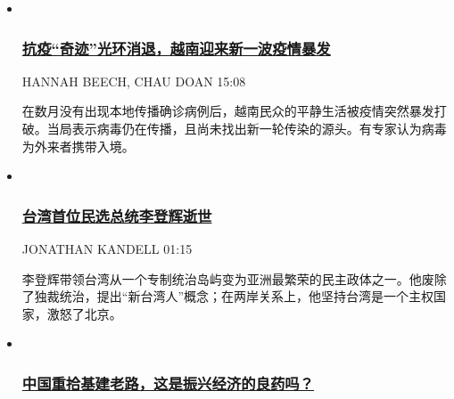 \begin{itemize}
\item ~
  \hypertarget{ux6297ux75abux5947ux8ff9ux5149ux73afux6d88ux9000ux8d8aux5357ux8fceux6765ux65b0ux4e00ux6ce2ux75abux60c5ux66b4ux53d1}{%
  \subsubsection{\texorpdfstring{\href{/asia-pacific/20200731/coronavirus-vietnam/}{抗疫``奇迹''光环消退，越南迎来新一波疫情暴发}}{抗疫``奇迹''光环消退，越南迎来新一波疫情暴发}}\label{ux6297ux75abux5947ux8ff9ux5149ux73afux6d88ux9000ux8d8aux5357ux8fceux6765ux65b0ux4e00ux6ce2ux75abux60c5ux66b4ux53d1}}

  HANNAH BEECH, CHAU DOAN 15:08

  \href{/asia-pacific/20200731/coronavirus-vietnam/}{}

  在数月没有出现本地传播确诊病例后，越南民众的平静生活被疫情突然暴发打破。当局表示病毒仍在传播，且尚未找出新一轮传染的源头。有专家认为病毒为外来者携带入境。
\item ~
  \hypertarget{ux53f0ux6e7eux9996ux4f4dux6c11ux9009ux603bux7edfux674eux767bux8f89ux901dux4e16}{%
  \subsubsection{\texorpdfstring{\href{/asia-pacific/20200730/lee-teng-hui-dead/}{台湾首位民选总统李登辉逝世}}{台湾首位民选总统李登辉逝世}}\label{ux53f0ux6e7eux9996ux4f4dux6c11ux9009ux603bux7edfux674eux767bux8f89ux901dux4e16}}

  JONATHAN KANDELL 01:15

  \href{/asia-pacific/20200730/lee-teng-hui-dead/}{}

  李登辉带领台湾从一个专制统治岛屿变为亚洲最繁荣的民主政体之一。他废除了独裁统治，提出``新台湾人''概念；在两岸关系上，他坚持台湾是一个主权国家，激怒了北京。
\item ~
  \hypertarget{ux4e2dux56fdux91cdux62feux57faux5efaux8001ux8defux8fd9ux662fux632fux5174ux7ecfux6d4eux7684ux826fux836fux5417}{%
  \subsubsection{\texorpdfstring{\href{/business/20200730/china-economy-infrastructure/}{中国重拾基建老路，这是振兴经济的良药吗？}}{中国重拾基建老路，这是振兴经济的良药吗？}}\label{ux4e2dux56fdux91cdux62feux57faux5efaux8001ux8defux8fd9ux662fux632fux5174ux7ecfux6d4eux7684ux826fux836fux5417}}


\end{itemize}
